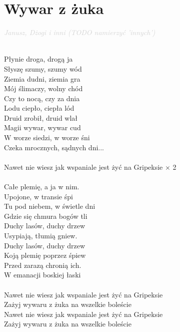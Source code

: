 \documentclass[a5paper, 10pt]{book}
\begin{document}
\newpage
\section{Wywar z żuka}\textcolor{lightgray}{\textit{Janusz, Dżogi i inni (TODO namierzyć 'innych')}}\\~\\
\begin{minipage}[t]{0.85\textwidth}
  Płynie droga, drogą ja             \\
Słyszę szumy, szumy wód\\
Ziemia dudni, ziemia gra      \\
Mój ślimaczy, wolny chód   \\
Czy to nocą, czy za dnia          \\
Lodu ciepło, ciepła lód\\
Druid zrobił, druid wlał             \\
Magii wywar, wywar cud\\
\hspace*{3mm}W worze siedzi, w worze śni     \\
\hspace*{3mm}Czeka mrocznych, sądnych dni...\\
\\
\hspace*{6mm}Nawet nie wiesz jak wspaniale jest żyć na Gripeksie $\times$ 2 \\
\\
Całe plemię, a ja w nim.       \\
Upojone, w transie śpi\\
Tu pod niebem, w świetle dni\\
Gdzie się chmura bogów tli   \\
Duchy lasów, duchy drzew      \\
Usypiają, tłumią gniew.      \\
Duchy lasów, duchy drzew    \\
Koją plemię poprzez śpiew    \\
\hspace*{3mm}Przed zarazą chronią ich.       \\
\hspace*{3mm}W emanacji boskiej łaski\\
\\
\hspace*{6mm}Nawet nie wiesz jak wspaniale jest żyć na Gripeksie        \\
\hspace*{6mm}Zażyj wywaru z żuka na wszelkie boleście           	       \\
\hspace*{6mm}Nawet nie wiesz jak wspaniale jest żyć na Gripeksie        \\
\hspace*{6mm}Zażyj wywaru z żuka na wszelkie boleście   \\


\end{minipage}
\end{document}

